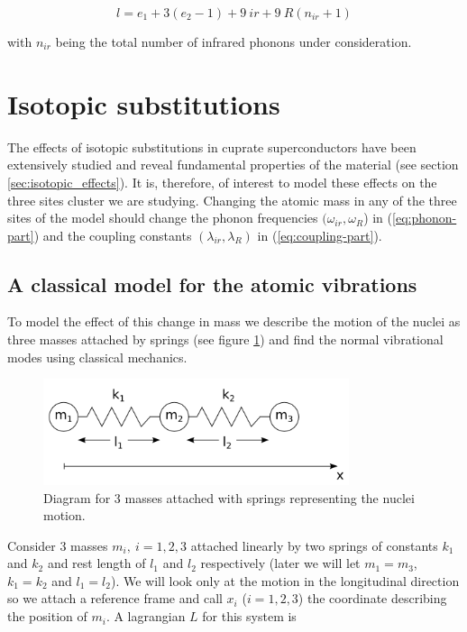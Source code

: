\begin{equation}
  \label{eq:label}
  l = e_1 + 3(e_2 - 1) + 9\ ir + 9\ R (n_{ir} +1)
\end{equation}

\noindent with $n_{ir}$ being the total number of infrared phonons under consideration.

\section{Isotopic substitutions}
\label{sec:isotopic-model}

The effects of isotopic substitutions in cuprate superconductors have been extensively studied and reveal fundamental properties of the material (see section \ref{sec:isotopic_effects}). 
It is, therefore, of interest to model these effects on the three sites cluster we are studying.
Changing the atomic mass in any of the three sites of the model should change the phonon frequencies $(\omega_{ir},\omega_R$) in (\ref{eq:phonon-part}) and the coupling constants $(\lambda_{ir},\lambda_R)$ in (\ref{eq:coupling-part}).

\subsection{A classical model for the atomic vibrations}

To model the effect of this change in mass we describe the motion of the nuclei as three masses attached by springs (see figure \ref{fig:3-masses-2-springs}) and find the normal vibrational modes using classical mechanics.

\begin{figure}[ht!]
\centering
\includegraphics[width=0.8\textwidth]{images/3-masses-2-springs-linear.png}
\caption{Diagram for 3 masses attached with springs representing the nuclei motion.}
\label{fig:3-masses-2-springs}
\end{figure}

Consider 3 masses $m_i,\ i=1,2,3$ attached linearly by two springs of constants $k_1$ and $k_2$ and rest length of $l_1$ and $l_2$ respectively (later we will let $ m_1=m_3$, $ k_1=k_2$ and $l_1=l_2$). 
We will look only at the motion in the longitudinal direction so we attach a reference frame and call $ x_i$ ($i=1,2,3$) the coordinate describing the position of $m_i$.
A lagrangian $L$ for this system is 

